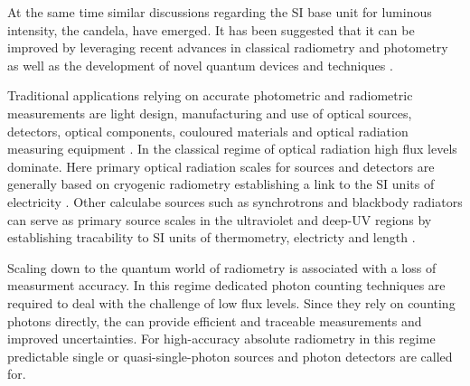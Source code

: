 			At the same time similar discussions regarding the SI base unit for luminous intensity, the candela, have emerged. It has been suggested that it can be improved by leveraging recent advances in classical radiometry and photometry as well as the development of novel quantum devices and techniques \cite{Cheung2007}.


			Traditional applications relying on accurate photometric and radiometric measurements are light design, manufacturing and use of optical sources, detectors, optical components, couloured materials and optical radiation measuring equipment \cite{zwinckels::paper}. In the classical regime of optical radiation high flux levels dominate. Here primary optical radiation scales for sources and detectors are generally based on cryogenic radiometry establishing a link to the SI units of electricity \cite{Cheung2007::5}. Other calculabe sources such as synchrotrons and blackbody radiators can serve as primary source scales in the ultraviolet and deep-UV regions by establishing tracability to SI units of thermometry, electricty and length \cite{zwinckels::paper, Cheung2007}.

			Scaling down to the quantum world of radiometry is associated with a loss of measurment accuracy. In this regime dedicated photon counting techniques are required to deal with the challenge of low flux levels. Since they rely on counting photons directly, the can provide efficient and traceable measurements and improved uncertainties. For high-accuracy absolute radiometry in this regime predictable single or quasi-single-photon sources and photon detectors are called for.




